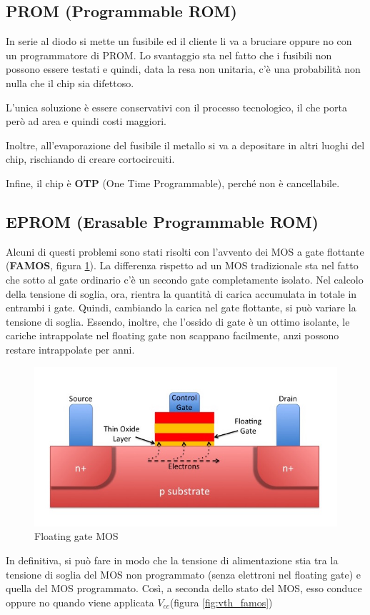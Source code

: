 \documentclass[11pt,4paper]{report}
\newcommand{\vcc}{$V_{cc}$}
\begin{document}
\subsection{PROM (Programmable ROM)}
In serie al diodo si mette un fusibile ed il cliente li va a bruciare oppure no con un programmatore di PROM. Lo svantaggio sta nel fatto che i fusibili non possono essere testati e quindi, data la resa non unitaria, c'è una probabilità non nulla che il chip sia difettoso.

L'unica soluzione è essere conservativi con il processo tecnologico, il che porta però ad area e quindi costi maggiori.

Inoltre, all'evaporazione del fusibile il metallo si va a depositare in altri luoghi del chip, rischiando di creare cortocircuiti.

Infine, il chip è \textbf{OTP} (One Time Programmable), perché non è cancellabile.

\subsection{EPROM (Erasable Programmable ROM)}
Alcuni di questi problemi sono stati risolti con l'avvento dei MOS a gate flottante (\textbf{FAMOS}, figura \ref{fig:famos}). La differenza rispetto ad un MOS tradizionale sta nel fatto che sotto al gate ordinario c'è un secondo gate completamente isolato. Nel calcolo della tensione di soglia, ora, rientra la quantità di carica accumulata in totale in entrambi i gate. Quindi, cambiando la carica nel gate flottante, si può variare la tensione di soglia. Essendo, inoltre, che l'ossido di gate è un ottimo isolante, le cariche intrappolate nel floating gate non scappano facilmente, anzi possono restare intrappolate per anni.

\begin{figure}[hbtp]
	\centering
	\includegraphics[width=0.4\linewidth]{memorie/famos.jpg}
	\caption{Floating gate MOS}
	\label{fig:famos}
\end{figure}

In definitiva, si può fare in modo che la tensione di alimentazione stia tra la tensione di soglia del MOS non programmato (senza elettroni nel floating gate) e quella del MOS programmato. Così, a seconda dello stato del MOS, esso conduce oppure no quando viene applicata \vcc (figura \ref{fig:vth_famos})
\end{document}
